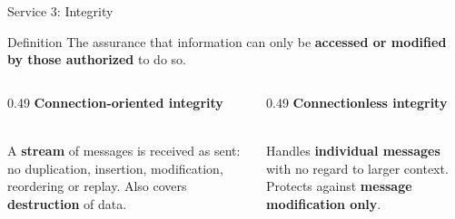 \documentclass[aspectratio=169,11pt,xcolor={table}]{beamer}
\begin{document}
\begin{frame}{Service 3: Integrity}
  \begin{block}{Definition}
    \small The assurance that information can only be \textbf{accessed or modified by those authorized} to do so.
  \end{block}
  \vspace{2mm}
  \begin{columns}[T]
    \begin{column}{0.49\textwidth}
      \centering
      \textbf{\textcolor{leaf!70!black}{Connection-oriented integrity}}\\[2mm]
      \\[1mm]
      {\small A \textbf{stream} of messages is received as sent: no duplication, insertion, modification, reordering or replay. Also covers \textbf{destruction} of data.}
    \end{column}
    \begin{column}{0.49\textwidth}
      \centering
      \textbf{\textcolor{ocean}{Connectionless integrity}}\\[2mm]
      \\[1mm]
      {\small Handles \textbf{individual messages} with no regard to larger context. Protects against \textbf{message modification only}.}
    \end{column}
  \end{columns}
\end{frame}
\end{document}
